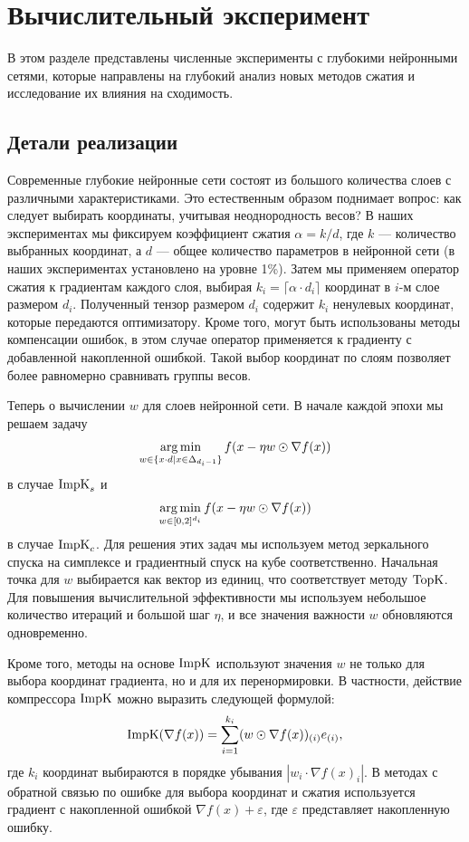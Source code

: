 \section{Вычислительный эксперимент} \label{section:experiments}

В этом разделе представлены численные эксперименты с глубокими нейронными сетями, которые направлены на глубокий анализ новых методов сжатия и исследование их влияния на сходимость.

\subsection{Детали реализации}
    Современные глубокие нейронные сети состоят из большого количества слоев с различными характеристиками. Это естественным образом поднимает вопрос: как следует выбирать координаты, учитывая неоднородность весов? В наших экспериментах мы фиксируем коэффициент сжатия $\alpha = k/d$, где $k$ — количество выбранных координат, а $d$ — общее количество параметров в нейронной сети (в наших экспериментах установлено на уровне 1\%). Затем мы применяем оператор сжатия к градиентам каждого слоя, выбирая $k_i = \lceil \alpha \cdot d_i \rceil$ координат в $i$-м слое размером $d_i$. Полученный тензор размером $d_i$ содержит $k_i$ ненулевых координат, которые передаются оптимизатору. Кроме того, могут быть использованы методы компенсации ошибок, в этом случае оператор применяется к градиенту с добавленной накопленной ошибкой. Такой выбор координат по слоям позволяет более равномерно сравнивать группы весов.

    Теперь о вычислении $w$ для слоев нейронной сети. В начале каждой эпохи мы решаем задачу
    \begin{equation}
        \operatorname*{arg\,min}_{w \in \{x \cdot d | x \in \Delta_{d_i - 1}\}} f(x - \eta w \odot \nabla f(x))
    \end{equation}
    в случае $\operatorname{ImpK}_s$ и 
    \begin{equation}
        \operatorname*{arg\,min}_{w \in [0,2]^{d_i}} f(x - \eta w \odot \nabla f(x))
    \end{equation}
    в случае $\operatorname{ImpK}_c$. Для решения этих задач мы используем метод зеркального спуска на симплексе и градиентный спуск на кубе соответственно. Начальная точка для $w$ выбирается как вектор из единиц, что соответствует методу $\operatorname{TopK}$. Для повышения вычислительной эффективности мы используем небольшое количество итераций и большой шаг $\eta$, и все значения важности $w$ обновляются одновременно.

    Кроме того, методы на основе $\operatorname{ImpK}$ используют значения $w$ не только для выбора координат градиента, но и для их перенормировки. В частности, действие компрессора $\operatorname{ImpK}$ можно выразить следующей формулой:
    \begin{align*}
        \operatorname{ImpK}(\nabla f(x)) = \sum_{i=1}^{k_i} (w \odot \nabla f(x))_{(i)} e_{(i)},
    \end{align*}
    где $k_i$ координат выбираются в порядке убывания $|w_i \cdot \nabla f(x)_i|$. 
    В методах с обратной связью по ошибке для выбора координат и сжатия используется градиент с накопленной ошибкой $\nabla f(x) + \varepsilon$, где $\varepsilon$ представляет накопленную ошибку.

